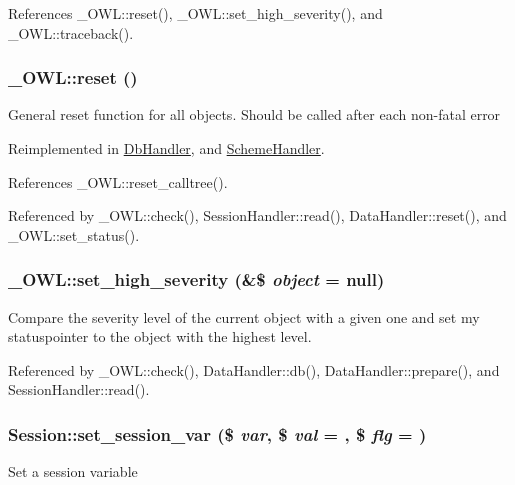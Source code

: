 References \_\-OWL::reset(), \_\-OWL::set\_\-high\_\-severity(), and \_\-OWL::traceback().

\subsubsection[{reset}]{\setlength{\rightskip}{0pt plus 5cm}\_\-OWL::reset ()}\label{class__OWL_a2f2a042bcf31965194c03033df0edc9b}
General reset function for all objects. Should be called after each non-\/fatal error 

Reimplemented in \hyperlink{classDbHandler_a9982df4830f05803935bb31bac7fae3d}{DbHandler}, and \hyperlink{classSchemeHandler_aa25feb4a70d67b3d571904be4b2f50bc}{SchemeHandler}.



References \_\-OWL::reset\_\-calltree().



Referenced by \_\-OWL::check(), SessionHandler::read(), DataHandler::reset(), and \_\-OWL::set\_\-status().

\subsubsection[{set\_\-high\_\-severity}]{\setlength{\rightskip}{0pt plus 5cm}\_\-OWL::set\_\-high\_\-severity (\&\$ {\em object} = {\ttfamily null})}\label{class__OWL_a576829692a3b66e3d518853bf43abae3}
Compare the severity level of the current object with a given one and set my statuspointer to the object with the highest level. 

Referenced by \_\-OWL::check(), DataHandler::db(), DataHandler::prepare(), and SessionHandler::read().

\subsubsection[{set\_\-session\_\-var}]{\setlength{\rightskip}{0pt plus 5cm}Session::set\_\-session\_\-var (\$ {\em var}, \/  \$ {\em val} = {}, \/  \$ {\em flg} = {})}\label{classSession_a178a3aa14d421509658f465b0b6bd398}
Set a session variable



